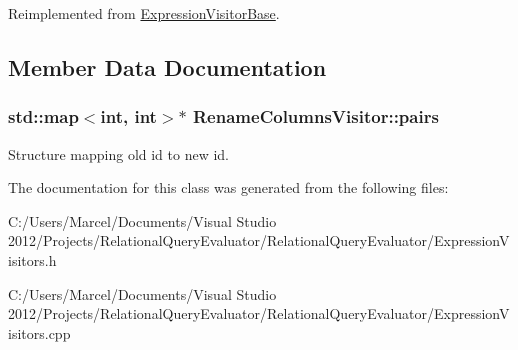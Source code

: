 Reimplemented from \hyperlink{class_expression_visitor_base_a1ac638b82248ff9e1582dbf520dc6ae4}{Expression\+Visitor\+Base}.



\subsection{Member Data Documentation}
\hypertarget{class_rename_columns_visitor_a40542b4f59af34a28e298d719ca426c1}{
\subsubsection[{pairs}]{\setlength{\rightskip}{0pt plus 5cm}std\+::map$<$int, int$>$$\ast$ Rename\+Columns\+Visitor\+::pairs}}\label{class_rename_columns_visitor_a40542b4f59af34a28e298d719ca426c1}
Structure mapping old id to new id. 

The documentation for this class was generated from the following files\+:\begin{DoxyCompactItemize}
\item 
C\+:/\+Users/\+Marcel/\+Documents/\+Visual Studio 2012/\+Projects/\+Relational\+Query\+Evaluator/\+Relational\+Query\+Evaluator/Expression\+Visitors.\+h\item 
C\+:/\+Users/\+Marcel/\+Documents/\+Visual Studio 2012/\+Projects/\+Relational\+Query\+Evaluator/\+Relational\+Query\+Evaluator/Expression\+Visitors.\+cpp\end{DoxyCompactItemize}
